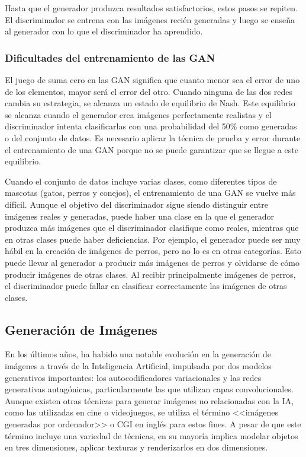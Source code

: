 Hasta que el generador produzca resultados satisfactorios, estos pasos se repiten. El discriminador se entrena con las imágenes recién generadas y luego se enseña al generador con lo que el discriminador ha aprendido. \parencite{bk_geron2019machilear}

\subsubsection{Dificultades del entrenamiento de las GAN}

El juego de suma cero en las GAN significa que cuanto menor sea el error de uno de los elementos, mayor será el error del otro. Cuando ninguna de las dos redes cambia su estrategia, se alcanza un estado de equilibrio de Nash. Este equilibrio se alcanza cuando el generador crea imágenes perfectamente realistas y el discriminador intenta clasificarlas con una probabilidad del 50\% como generadas o del conjunto de datos. Es necesario aplicar la técnica de prueba y error durante el entrenamiento de una GAN porque no se puede garantizar que se llegue a este equilibrio. \parencite{bk_geron2019machilear}

Cuando el conjunto de datos incluye varias clases, como diferentes tipos de mascotas (gatos, perros y conejos), el entrenamiento de una GAN se vuelve más difícil. Aunque el objetivo del discriminador sigue siendo distinguir entre imágenes reales y generadas, puede haber una clase en la que el generador produzca más imágenes que el discriminador clasifique como reales, mientras que en otras clases puede haber deficiencias. Por ejemplo, el generador puede ser muy hábil en la creación de imágenes de perros, pero no lo es en otras categorías. Esto puede llevar al generador a producir más imágenes de perros y olvidarse de cómo producir imágenes de otras clases. Al recibir principalmente imágenes de perros, el discriminador puede fallar en clasificar correctamente las imágenes de otras clases. \parencite{bk_geron2019machilear}

\subsection{Generación de Imágenes}

En los últimos años, ha habido una notable evolución en la generación de imágenes a través de la Inteligencia Artificial, impulsada por dos modelos generativos importantes: los autocodificadores variacionales y las redes generativas antagónicas, particularmente las que utilizan capas convolucionales. Aunque existen otras técnicas para generar imágenes no relacionadas con la IA, como las utilizadas en cine o videojuegos, se utiliza el término <<imágenes generadas por ordenador>> o CGI en inglés para estos fines. A pesar de que este término incluye una variedad de técnicas, en su mayoría implica modelar objetos en tres dimensiones, aplicar texturas y renderizarlos en dos dimensiones. \parencite{tec_kingma2019variat}

